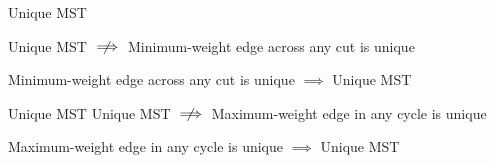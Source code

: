 \begin{frame}{}
  \begin{exampleblock}{Unique MST}
    \centerline{Unique MST $\centernot\implies$ Minimum-weight edge across any cut is unique}
  \end{exampleblock}

  \pause

  \pause
  \begin{theorem}
    \centerline{Minimum-weight edge across any cut is unique $\implies$ Unique MST}
  \end{theorem}
\end{frame}

\begin{frame}{}
  \begin{exampleblock}{Unique MST}
    Unique MST $\centernot\implies$ Maximum-weight edge in any cycle is unique
  \end{exampleblock}

  \pause

  \pause
  \begin{theorem}
    \centerline{Maximum-weight edge in any cycle is unique $\implies$ Unique MST}
  \end{theorem}

\end{frame}

\begin{frame}{}

  \begin{columns}
  \end{columns}
\end{frame}

% 
% 
% 
% 

